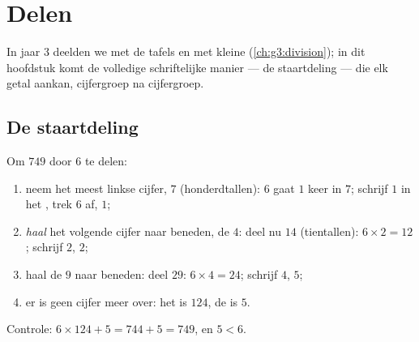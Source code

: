 \chapter{Delen}\label{ch:g4:division}

In jaar 3 deelden we met de tafels en met kleine 
(\cref{ch:g3:division}); in dit hoofdstuk komt de volledige schriftelijke
manier --- de staartdeling --- die elk getal aankan, cijfergroep na
cijfergroep.

\section{De staartdeling}

\begin{method}\label{met:g4:division:method}
Om $749$ door $6$ te delen:
\begin{enumerate}
  \item neem het meest linkse cijfer, $7$ (honderdtallen): $6$ gaat $1$
        keer in $7$; schrijf $1$ in het , trek $6$ af,  $1$;
  \item \emph{haal} het volgende cijfer naar beneden, de $4$: deel nu
        $14$ (tientallen): $6 \times 2 = 12$; schrijf $2$,  $2$;
  \item haal de $9$ naar beneden: deel $29$: $6 \times 4 = 24$; schrijf
        $4$,  $5$;
  \item er is geen cijfer meer over: het  is $124$, de  is
        $5$.
\end{enumerate}
Controle: $6 \times 124 + 5 = 744 + 5 = 749$, en $5 < 6$.
\end{method}

